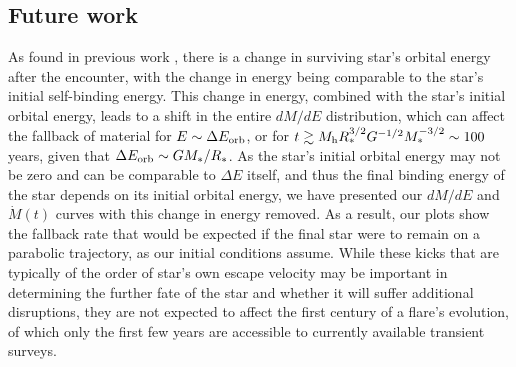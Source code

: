 \documentclass[twocolumn]{emulateapj}
\newcommand{\dmde}{dM/dE}
\newcommand{\md}{\dot{M}\left(t\right)}
\newcommand{\mh}{M_{\rm h}}
\begin{document}
\subsection{Future work}

As found in previous work \citep{Faber:2005be,Guillochon:2011be}, there is a change in surviving star's orbital energy after the encounter, with the change in energy being comparable to the star's initial self-binding energy. This change in energy, combined with the star's initial orbital energy, leads to a shift in the entire $\dmde$ distribution, which can affect the fallback of material for $E \sim \Delta E_{\rm orb}$, or for $t \gtrsim \mh R_{\ast}^{3/2} G^{-1/2} M_{\ast}^{-3/2} \sim 100$ years, given that $\Delta E_{\rm orb} \sim G M_{\ast}/R_{\ast}$. As the star's initial orbital energy may not be zero and can be comparable to $\Delta E$ itself, and thus the final binding energy of the star depends on its initial orbital energy, we have presented our $\dmde$ and $\md$ curves with this change in energy removed. As a result, our plots show the fallback rate that would be expected if the final star were to remain on a parabolic trajectory, as our initial conditions assume. While these kicks that are typically of the order of star's own escape velocity may be important in determining the further fate of the star and whether it will suffer additional disruptions, they are not expected to affect the first century of a flare's evolution, of which only the first few years are accessible to currently available transient surveys. 
\end{document}
